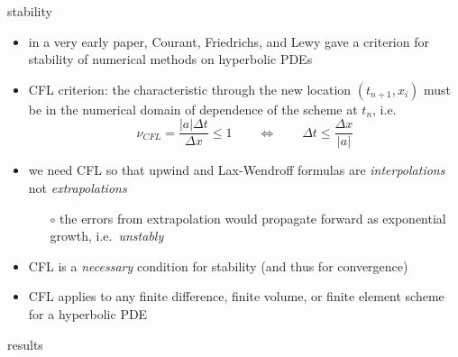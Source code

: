 \documentclass[10pt,dvipsnames,usepdftitle=false,
hyperref={pdftitle = {Finite volume methods},
    pdfauthor = {Ed Bueler}}]{beamer}
\begin{document}
\begin{frame}{stability}

\begin{itemize}
\item in a very early paper, Courant, Friedrichs, and Lewy gave a criterion for stability of numerical methods on hyperbolic PDEs
\item \alert{CFL criterion:} the characteristic through the new location $(t_{n+1},x_i)$ must be in the numerical domain of dependence of the scheme at $t_n$, i.e.
    $$\nu_{CFL} = \frac{|a|\Delta t}{\Delta x} \le 1 \qquad \iff \qquad \Delta t \le \frac{\Delta x}{|a|}$$

\item we need CFL so that upwind and Lax-Wendroff formulas are \emph{interpolations} not \emph{extrapolations}
    \begin{itemize}
    \item[$\circ$] the errors from extrapolation would propagate forward as exponential growth, i.e.~\emph{unstably}
    \end{itemize}
\item CFL is a \emph{necessary} condition for stability (and thus for convergence)
\item CFL applies to any finite difference, finite volume, or finite element scheme for a hyperbolic PDE
\end{itemize}
\end{frame}


\begin{frame}{results}

\end{frame}
\end{document}
